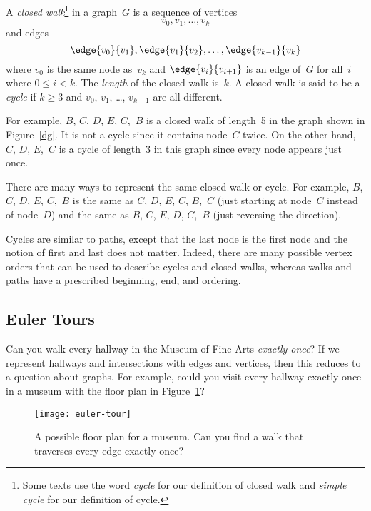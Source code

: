 \begin{definition}
A \emph{closed walk}\footnote{Some texts use the word \emph{cycle} for
  our definition of closed walk and \emph{simple cycle} for our
  definition of cycle.} in a graph~$G$ is a sequence of vertices
\begin{equation*}
    v_0, v_1, \dots, v_k
\end{equation*}
and edges
\begin{equation*}
    \edge{v_0}{v_1}, \edge{v_1}{v_2}, \dots, \edge{v_{k - 1}}{v_k}
\end{equation*}
where $v_0$ is the same node as~$v_k$ and $\edge{v_i}{v_{i + 1}}$ is
an edge of~$G$ for all~$i$ where $0 \le i < k$.  The \emph{length} of
the closed walk is~$k$.  A closed walk is said to be a \emph{cycle} if
$k \ge 3$ and $v_0$, $v_1$, \dots, $v_{k - 1}$ are all different.
\end{definition}

For example, $B$, $C$, $D$, $E$, $C$,~$B$ is a closed walk of length~5
in the graph shown in Figure~\ref{dg}. It is not a
cycle since it contains node~$C$ twice.  On the other hand, $C$, $D$,
$E$,~$C$ is a cycle of length~3 in this graph since every node appears
just once.

There are many ways to represent the same closed walk or cycle.  For
example, $B$, $C$, $D$, $E$, $C$,~$B$ is the same as $C$, $D$, $E$,
$C$, $B$,~$C$ (just starting at node~$C$ instead of node~$D$) and the
same as $B$, $C$, $E$, $D$, $C$,~$B$ (just reversing the direction).

Cycles are similar to paths, except that the last node is the first
node and the notion of first and last does not matter.  Indeed, there
are many possible vertex orders that can be used to describe cycles
and closed walks, whereas walks and paths have a prescribed beginning,
end, and ordering.

\subsection{Euler Tours}

Can you walk every hallway in the Museum of Fine Arts \emph{exactly
  once}?  If we represent hallways and intersections with edges and
vertices, then this reduces to a question about graphs.  For example,
could you visit every hallway exactly once in a museum with the
floor plan in Figure~\ref{fig:5BC}?

\begin{figure}

\texttt{[image: euler-tour]}

\caption{A possible floor plan for a museum. Can you find a walk that
  traverses every edge exactly once?}

\label{fig:5BC}

\end{figure}

